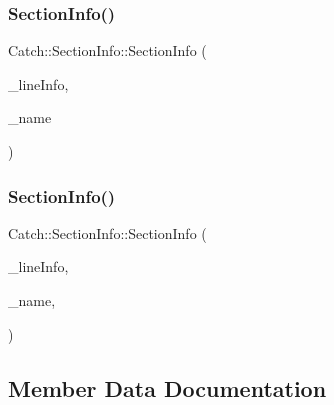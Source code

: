 \subsubsection{\texorpdfstring{Section\+Info()}{SectionInfo()}\hspace{0.1cm}{\footnotesize\ttfamily [1/2]}}
{\footnotesize\ttfamily Catch\+::\+Section\+Info\+::\+Section\+Info (\begin{DoxyParamCaption}\item[{\mbox{\hyperlink{struct_catch_1_1_source_line_info}{Source\+Line\+Info}} const \&}]{\+\_\+line\+Info,  }\item[{std\+::string const \&}]{\+\_\+name }\end{DoxyParamCaption})}

\mbox{\label{struct_catch_1_1_section_info_a139875f2e7bd12a5898a948f8bad15b3}} 
\subsubsection{\texorpdfstring{Section\+Info()}{SectionInfo()}\hspace{0.1cm}{\footnotesize\ttfamily [2/2]}}
{\footnotesize\ttfamily Catch\+::\+Section\+Info\+::\+Section\+Info (\begin{DoxyParamCaption}\item[{\mbox{\hyperlink{struct_catch_1_1_source_line_info}{Source\+Line\+Info}} const \&}]{\+\_\+line\+Info,  }\item[{std\+::string const \&}]{\+\_\+name,  }\item[{std\+::string const \&}]{ }\end{DoxyParamCaption})\hspace{0.3cm}{\ttfamily [inline]}}



\subsection{Member Data Documentation}
\mbox{\label{struct_catch_1_1_section_info_a0052060219a6de74bb7ade34d4163a4e}} 

